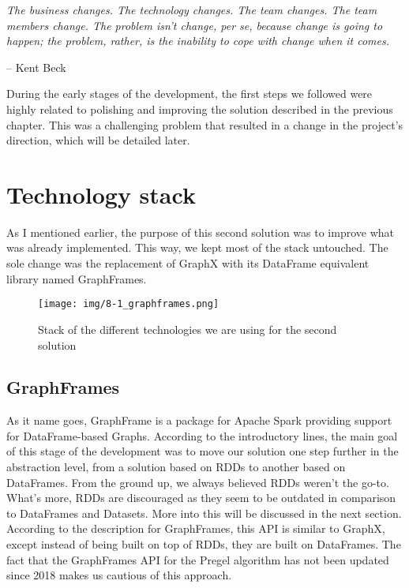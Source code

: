 \epigraph{\textit{The business changes. The technology changes. The team changes. The team members change. The problem isn't change, per se, because change is going to happen; the problem, rather, is the inability to cope with change when it comes.}}{-- \textup{Kent Beck}}

During the early stages of the development, the first steps we followed were highly related to polishing and improving the solution described in the previous chapter. This was a challenging problem that resulted in a change in the project's direction, which will be detailed later.

\section{Technology stack}

As I mentioned earlier, the purpose of this second solution was to improve what was already implemented. This way, we kept most of the stack untouched. The sole change was the replacement of GraphX with its DataFrame equivalent library named GraphFrames.

\begin{figure}[ht]
    \centering
    \texttt{[image: img/8-1\_graphframes.png]}
    \caption[Stack of the different technologies we are using for the second solution]{Stack of the different technologies we are using for the second solution\footnotemark}
\end{figure}


\subsection{GraphFrames}

As it name goes, GraphFrame is a package for Apache Spark providing support for DataFrame-based Graphs. According to the introductory lines, the main goal of this stage of the development was to move our solution one step further in the abstraction level, from a solution based on RDDs to another based on DataFrames. From the ground up, we always believed RDDs weren't the go-to. What's more, RDDs are discouraged as they seem to be outdated in comparison to DataFrames and Datasets. More into this will be discussed in the next section. According to the description for GraphFrames, this API is similar to GraphX, except instead of being built on top of RDDs, they are built on DataFrames. The fact that the GraphFrames API for the Pregel algorithm has not been updated since 2018 makes us cautious of this approach.

